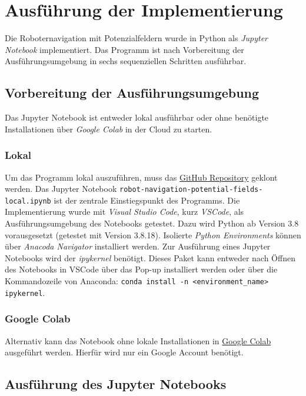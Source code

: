 \chapter{Ausführung der Implementierung}

Die Roboternavigation mit Potenzialfeldern wurde in Python als \textit{Jupyter Notebook} implementiert.
Das Programm ist nach Vorbereitung der Ausführungsumgebung in sechs sequenziellen Schritten ausführbar.

\section{Vorbereitung der Ausführungsumgebung}

Das Jupyter Notebook ist entweder lokal ausführbar oder ohne benötigte Installationen über \textit{Google Colab} in der Cloud zu starten.

\subsection*{Lokal}
Um das Programm lokal auszuführen, muss das \href{https://github.com/ca-schue/potential-field.git}{GitHub Repository} geklont werden.
Das Jupyter Notebook \texttt{robot-navigation-potential-fields-local.ipynb} ist der zentrale Einstiegspunkt des Programms.
Die Implementierung wurde mit \textit{Visual Studio Code}, kurz \textit{VSCode}, als Ausführungsumgebung des Notebooks getestet.
Dazu wird Python ab Version 3.8 vorausgesetzt (getestet mit Version 3.8.18).
Isolierte \textit{Python Environments} können über \textit{Anacoda Navigator} installiert werden.
Zur Ausführung eines Jupyter Notebooks wird der \textit{ipykernel} benötigt. Dieses Paket kann entweder nach Öffnen des Notebooks in VSCode über das Pop-up installiert werden oder über die Kommandozeile von Anaconda: \texttt{conda install -n <environment\_name> ipykernel}.

\subsection*{Google Colab}
Alternativ kann das Notebook ohne lokale Installationen in \href{https://colab.research.google.com/gist/ca-schue/73cff6faf02b6d75d84573625fd89bea/robot-navigation-with-potential-fields.ipynb}{Google Colab} ausgeführt werden. Hierfür wird nur ein Google Account benötigt.


\section{Ausführung des Jupyter Notebooks}

